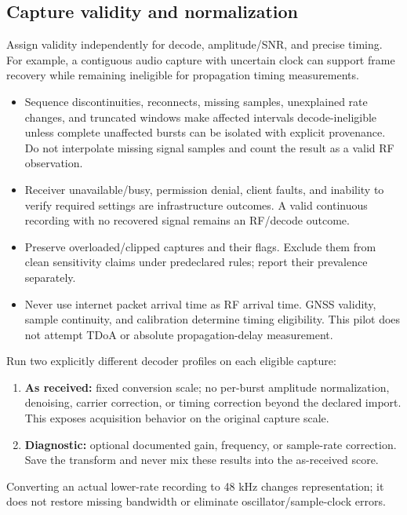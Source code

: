 \documentclass[11pt,a4paper]{article}
\begin{document}
\subsection{Capture validity and normalization}
\label{md:7}

Assign validity independently for decode, amplitude/SNR, and precise timing. For example, a contiguous audio capture with uncertain clock can support frame recovery while remaining ineligible for propagation timing measurements.

\begin{itemize}
\item Sequence discontinuities, reconnects, missing samples, unexplained rate changes, and truncated windows make affected intervals decode-ineligible unless complete unaffected bursts can be isolated with explicit provenance. Do not interpolate missing signal samples and count the result as a valid RF observation.
\item Receiver unavailable/busy, permission denial, client faults, and inability to verify required settings are infrastructure outcomes. A valid continuous recording with no recovered signal remains an RF/decode outcome.
\item Preserve overloaded/clipped captures and their flags. Exclude them from clean sensitivity claims under predeclared rules; report their prevalence separately.
\item Never use internet packet arrival time as RF arrival time. GNSS validity, sample continuity, and calibration determine timing eligibility. This pilot does not attempt TDoA or absolute propagation-delay measurement.
\end{itemize}
Run two explicitly different decoder profiles on each eligible capture:

\begin{enumerate}
\item \textbf{As received:} fixed conversion scale; no per-burst amplitude normalization, denoising, carrier correction, or timing correction beyond the declared import. This exposes acquisition behavior on the original capture scale.
\item \textbf{Diagnostic:} optional documented gain, frequency, or sample-rate correction. Save the transform and never mix these results into the as-received score.
\end{enumerate}
Converting an actual lower-rate recording to 48 kHz changes representation; it does not restore missing bandwidth or eliminate oscillator/sample-clock errors.
\end{document}
